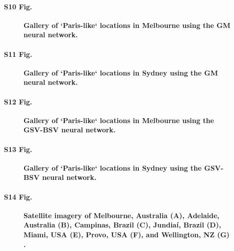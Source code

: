 \documentclass[10pt,letterpaper]{article}
\begin{document}
\paragraph*{S10 Fig.}
\begin{figure}[!htbp]
\centering   
\caption{\bf Gallery of `Paris-like` locations in Melbourne using the GM neural network.}    
 \label{fig:gm_mel_gallery} 
\end{figure} 

\paragraph*{S11 Fig.}
\begin{figure}[!htbp]
\centering   
\caption{\bf Gallery of `Paris-like` locations in Sydney using the GM neural network.}    
 \label{fig:gm_syd_gallery}  
\end{figure} 

\paragraph*{S12 Fig.}
\begin{figure}[!htbp]
\centering    
\caption{\bf Gallery of `Paris-like` locations in Melbourne using the GSV-BSV neural network.}    
 \label{fig:gsv_mel_gallery}  
\end{figure} 

\paragraph*{S13 Fig.}
\begin{figure}[!htbp]
\centering    
\caption{\bf Gallery of `Paris-like` locations in Sydney using the GSV-BSV neural network.}    
 \label{fig:gsv_syd_gallery}  
\end{figure} 



\paragraph*{S14 Fig.}
\begin{figure}[!htbp]
\centering    
 \caption{\bf Satellite imagery of Melbourne, Australia (A), Adelaide, Australia (B), Campinas, Brazil (C), Jundia\'{i}, Brazil (D), Miami, USA (E), Provo, USA (F), and Wellington, NZ (G) \cite{GoogleStatic2017}.}    
 \label{fig:satimages}  
\end{figure} 
\end{document}

